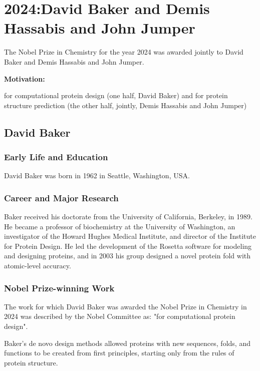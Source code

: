 \chapter{2024:David Baker and Demis Hassabis and John Jumper}

\label{chap:chemistry2024}

The Nobel Prize in Chemistry for the year 2024 was awarded jointly to David Baker and Demis Hassabis and John Jumper.

\textbf{Motivation:}

for computational protein design (one half, David Baker) and for protein structure prediction (the other half, jointly, Demis Hassabis and John Jumper)

\section{David Baker}

\subsection*{Early Life and Education}

David Baker was born in 1962 in Seattle, Washington, USA.

\subsection*{Career and Major Research}

Baker received his doctorate from the University of California, Berkeley, in 1989. He became a professor of biochemistry at the University of Washington, an investigator of the Howard Hughes Medical Institute, and director of the Institute for Protein Design. He led the development of the Rosetta software for modeling and designing proteins, and in 2003 his group designed a novel protein fold with atomic-level accuracy.

\subsection*{Nobel Prize-winning Work}

The work for which David Baker was awarded the Nobel Prize in Chemistry in 2024 was described by the Nobel Committee as: "for computational protein design".

Baker's de novo design methods allowed proteins with new sequences, folds, and functions to be created from first principles, starting only from the rules of protein structure.

